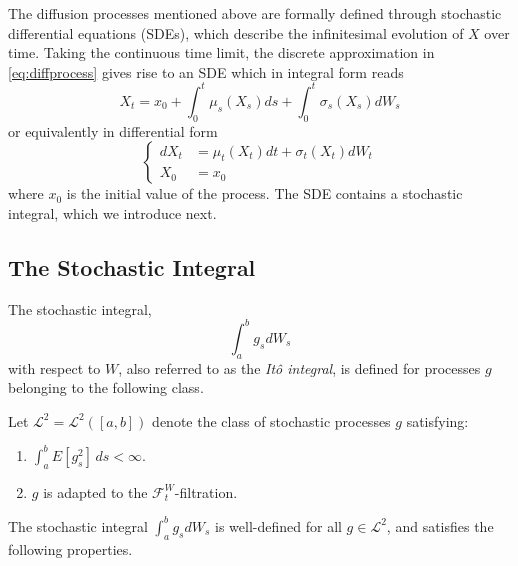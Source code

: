 The diffusion processes mentioned above are formally defined through stochastic differential equations (SDEs), which describe the infinitesimal evolution of $X$ over time. Taking the continuous time limit, the discrete approximation in \eqref{eq:diffprocess} gives rise to an SDE which in integral form reads
\begin{equation}
X_t=x_0+\int_0^t\mu_s(X_s)ds+\int_0^t\sigma_s(X_s)dW_s
    \label{eq:SDEIntegral}
\end{equation}
 or equivalently in differential form
\begin{equation}
    \left\{\begin{aligned}
        dX_t &= \mu_t(X_t)dt+\sigma_t(X_t)dW_t \\
        X_0 &= x_0
    \end{aligned}\right.
    \label{eq:SDE}
\end{equation}
where $x_0$ is the initial value of the process. The SDE contains a stochastic integral, which we introduce next.


\subsection{The Stochastic Integral}

The stochastic integral, 
\begin{equation}
    \int_a^bg_sdW_s
    \label{ItoIntegral}
\end{equation}
with respect to $W$, also referred to as the \textit{Itô integral}, is defined for processes $g$ belonging to the following class.

\begin{definition}
    Let $\mathcal{L}^2=\mathcal{L}^2([a,b])$ denote the class of stochastic processes $g$ satisfying:
    \begin{enumerate}
        \item $\int_a^b E[g_s^2]\, ds < \infty$.
        \item $g$ is adapted to the $\mathcal{F}_t^W$-filtration.
    \end{enumerate}
    \label{def:L2}
\end{definition}

The stochastic integral $\int_a^bg_sdW_s$ is well-defined for all $g\in\mathcal{L}^2$, and satisfies the following properties.

